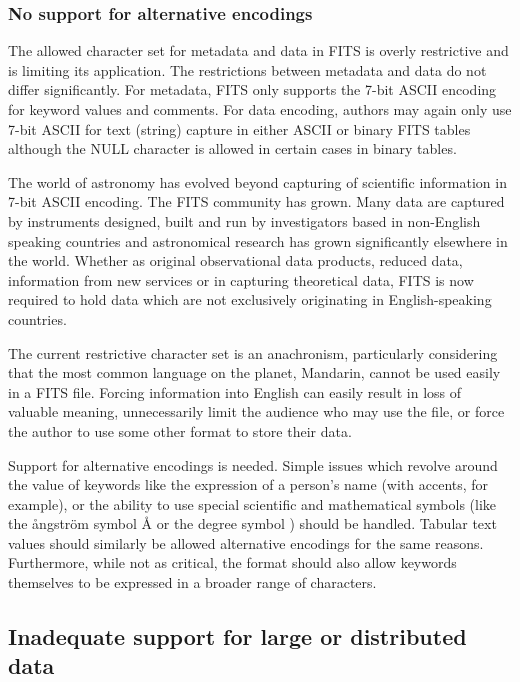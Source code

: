 \documentclass[final,authoryear,5p,times,twocolumn]{elsarticle}
\begin{document}
{{\subsubsection{No support for alternative encodings}
\label{section_char_encoding}

The allowed character set for metadata and data in FITS is overly
restrictive and is limiting its application. The restrictions between
metadata and data do not differ significantly. For metadata,
FITS only supports the 7-bit
ASCII encoding for keyword values and comments. For data encoding,
authors may again only use 7-bit ASCII for text (string) capture in
either ASCII or binary FITS tables although the NULL character is
allowed in certain cases in binary tables.


The world of astronomy has evolved beyond capturing of scientific
information in 7-bit ASCII encoding. The FITS community has grown.
Many data are captured by instruments designed, built and run by
investigators based in non-English speaking countries and astronomical
research has grown significantly elsewhere in the world. Whether as
original observational data products, reduced data, information from new
services or in capturing theoretical data, FITS is now required to hold
data which are not exclusively originating in English-speaking countries.


The current restrictive character set is an
anachronism, particularly considering that the most common language on the planet,
Mandarin, cannot be used easily in a FITS file. Forcing information
into English can easily result in loss of valuable meaning, unnecessarily
limit the audience who may use the file, or force the author to use some other
format to store their data.


Support for alternative encodings is needed.
Simple issues which revolve around the value of keywords like the
expression of a person's name (with accents, for example), or the
ability to use special scientific and mathematical symbols (like the
\r{a}ngstr\"{o}m symbol \r{A} or the degree symbol \degree) should be
handled. Tabular text values should similarly be allowed alternative
encodings for the same reasons.  Furthermore, while not as critical, the
format should also allow keywords themselves to be expressed in a broader
range of characters.


\subsection{Inadequate support for large or distributed data}
\label{section_poor_large_data_support}

}}
\end{document}
